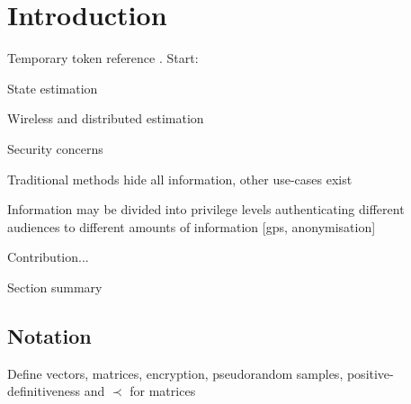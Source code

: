 \documentclass[conference]{IEEEtran}
\theoremstyle{definition}
\theoremstyle{definition}
\theoremstyle{remark}
\begin{document}

\IEEEpeerreviewmaketitle

% 
%                                                        
%                                                        
%                                                        
% 

\section{Introduction}
Temporary token reference \cite{katzIntroductionModernCryptography2008}. Start:

State estimation

Wireless and distributed estimation

Security concerns

Traditional methods hide all information, other use-cases exist

Information may be divided into privilege levels authenticating different audiences to different amounts of information [gps, anonymisation]

Contribution...

Section summary

\subsection{Notation}
Define vectors, matrices, encryption, pseudorandom samples, positive-definitiveness and $\prec$ for matrices


% 
%                                              
%                                              
%                                              
% 
\end{document}
